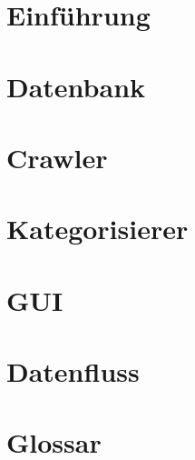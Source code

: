

	\maketitle
	\setcounter{tocdepth}{1}
	\tableofcontents

	\chapter{Einführung}
			
	\chapter{Datenbank}
	\label{chap:datenbank}
		
	\chapter{Crawler}
	\label{chap:crawler}
		
	\chapter{Kategorisierer}
	\label{chap:kategorisierer}
		
	\chapter{GUI}
	\label{chap:gui}
		
	\chapter{Datenfluss}
	\label{chap:datenfluss}
		
	\chapter{Glossar}
		

